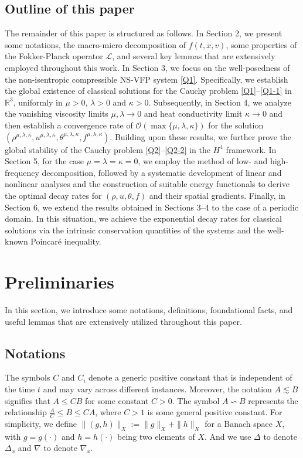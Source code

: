 \documentclass[reqno,11pt]{amsart}
\theoremstyle{plain}
\numberwithin{equation}{section}
\begin{document}
\subsection{Outline of this paper}
The remainder of this paper is structured as follows. In Section 2, we present some notations, 
the macro-micro decomposition of $f(t,x,v)$, some properties of the Fokker-Planck operator
 $\mathcal{L}$, and several key lemmas that are extensively employed throughout this work. 
 In Section 3, we focus on the well-posedness  of the non-isentropic  compressible NS-VFP  
 system \eqref{Q1}. Specifically, we   establish the global existence of classical solutions
  for the Cauchy problem  \eqref{Q1}--\eqref{Q1-1} in $\mathbb{R}^3$,  uniformly in 
   $\mu>0$, $\lambda>0$ and $\kappa > 0$. 
Subsequently, in Section 4, we analyze the  vanishing   viscosity limits
  $\mu,\lambda\rightarrow0$ and
  heat conductivity limit   $\kappa \to 0$   and then establish a convergence rate of 
  $\mathcal{O}(\max\{\mu,\lambda,\kappa\})$ for the solution $(\rho^{\mu,\lambda,\kappa}, u^{\mu,\lambda,\kappa}, \theta^{\mu,\lambda,\kappa}, f^{\mu,\lambda,\kappa})$. 
  Building upon these results, we further prove the global stability of the Cauchy problem 
  \eqref{Q2}--\eqref{Q2-2}  in the $H^4$ framework.
In Section 5, for the case $\mu=\lambda=\kappa = 0$, we employ the method of low- and high-frequency 
decomposition, followed by a systematic development of linear and nonlinear analyses and the construction
 of suitable energy functionals to derive the optimal decay rates for $(\rho, u, \theta, f)$ and their 
 spatial gradients. Finally, in Section 6, we extend the results obtained in Sections 3–4 to the case
  of a periodic domain.
In this situation, we   achieve the exponential decay rates for classical solutions via the intrinsic 
 conservation   quantities of the systems and the well-known Poincar\'{e} inequality.





 \section{Preliminaries}
In this section, we introduce some notations, definitions, foundational facts, 
and useful lemmas that are extensively utilized throughout this paper.

\subsection{Notations}
The symbols $C$ and $C_i$ denote  a generic positive constant that is independent of the time 
$t$ and may vary across different instances. 
Moreover, the notation $A \lesssim B$ signifies that $A \leq CB$ for some constant $C>0$. 
The symbol $A\backsim B$ represents the relationship $\frac{A}{C}\leq B\leq CA$, 
where $C>1$ is some general positive constant. For simplicity, we define $\|(g, h)\|_X := \|g\|_X + \|h\|_X$ 
for a Banach space $X$, with $g = g(\cdot)$ and $h = h(\cdot)$ being two elements of $X$.
And we use $\Delta$ to denote $\Delta_x$ and $\nabla$ to denote $\nabla_x$.
\end{document}
